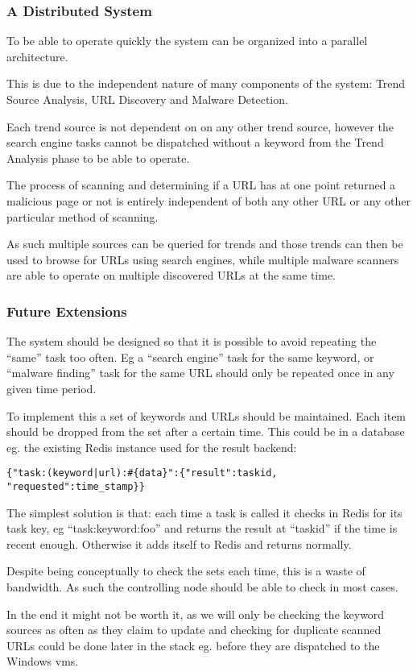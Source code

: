 \subsubsection{A Distributed System}
To be able to operate quickly the system can be organized into a parallel architecture.

This is due to the independent nature of many components of the system: Trend Source Analysis, URL Discovery and Malware Detection.

Each trend source is not dependent on on any other trend source, however the search engine tasks cannot be dispatched without a keyword from the Trend Analysis phase to be able to operate.

The process of scanning and determining if a URL has at one point returned a malicious page or not is entirely independent of both any other URL or any other particular method of scanning.

As such multiple sources can be queried for trends and those trends can then be used to browse for URLs using search engines, while multiple malware scanners are able to operate on multiple discovered URLs at the same time.

\subsubsection{Future Extensions}
The system should be designed so that it is possible to avoid repeating the ``same'' task too often. Eg a ``search engine'' task for the same keyword, or ``malware finding'' task for the same URL should only be repeated once in any given time period.

To implement this a set of keywords and URLs should be maintained. Each item should be dropped from the set after a certain time. This could be in a database eg. the existing Redis instance used for the result backend:

\verb/{"task:(keyword|url):#{data}":{"result":taskid, "requested":time_stamp}}/

The simplest solution is that: each time a task is called it checks in Redis for its task key, eg ``task:keyword:foo'' and returns the result at ``taskid'' if the time is recent enough. Otherwise it adds itself to Redis and returns normally.

Despite being conceptually to check the sets each time, this is a waste of bandwidth. As such the controlling node should be able to check in most cases.

In the end it might not be worth it, as we will only be checking the keyword sources as often as they claim to update and checking for duplicate scanned URLs could be done later in the stack eg. before they are dispatched to the Windows vms.

